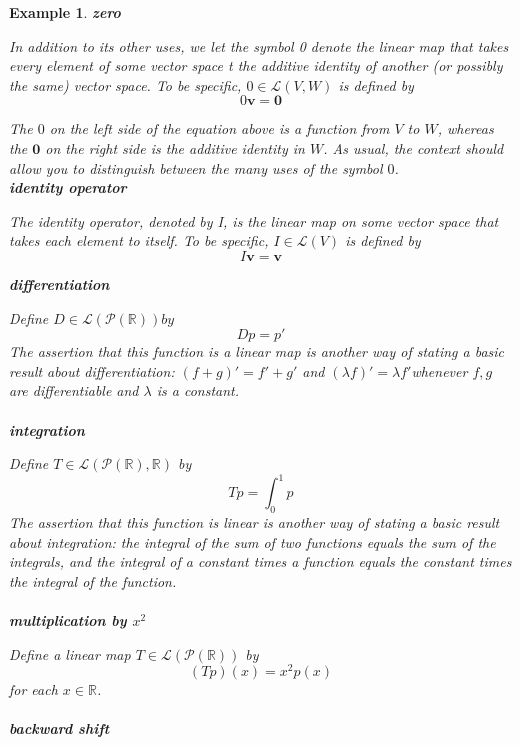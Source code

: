 \documentclass{article}
\newtheorem{example}{Example}[subsection]
\newcommand{\RR}{\mathbb{R}}
\newcommand{\ve}{\boldsymbol}
\begin{document}
\begin{CJK}{UTF8}{gkai}
\begin{example}
\textbf{zero\\}

In addition to its other uses, we let the symbol 0 denote the linear map that takes every element of some vector space t the additive identity of another (or possibly the same) vector space. To be specific, $0 \in \mathcal{L}(V,W)$ is defined by \[0\ve{v}  = \ve{0}\]

The $0$ on the left side of the equation above is a function from $V$ to $W$, whereas the $\ve{0}$ on the right side is the additive identity in $W$. As usual, the context should allow you to distinguish between the many uses of the symbol $0$.\\

\textbf{identity operator\\}

The identity operator, denoted by I, is the linear map on some vector space that takes each element to itself. To be specific, $I \in \mathcal{L}(V)$ is defined by
\[I\ve{v} = \ve{v}\]

\textbf{differentiation\\}

Define $D \in \mathcal{L}(\mathcal{P}(\RR))by$
\[Dp =p'\]
The assertion that this function is a linear map is another way of stating a basic result about differentiation: $(f + g)' = f' +g'$ and $(\lambda f)' = \lambda f' $whenever $f,g$ are differentiable and $\lambda$  is a constant.\\
\\

\textbf{integration\\}

Define $T \in \mathcal{L}(\mathcal{P}(\RR),\RR)$ by
\[T p = \int_{0}^{1}p\]
The assertion that this function is linear is another way of stating a basic result about integration: the integral of the sum of two functions equals the sum of the integrals, and the integral of a constant times a function equals the constant times the integral of the function. \\
\\

\textbf{multiplication by $x^2$\\} 

Define a linear map $T \in \mathcal{L}(\mathcal{P}(\RR))$ by 
\[(Tp)(x) = x^2p(x)\]
for each $x \in \RR$.\\
\\

\textbf{backward shift\\}


\end{example}
\end{CJK}
\end{document}
